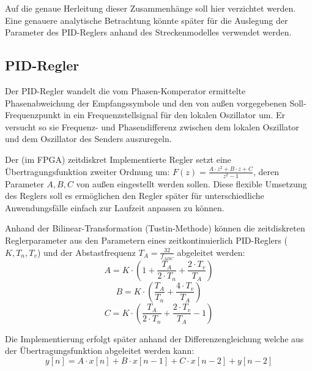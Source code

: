 Auf die genaue Herleitung dieser Zusammenhänge soll hier verzichtet werden. Eine genauere analytische Betrachtung \cite{IEEE_ART_COSTAS} könnte später für die Auslegung der Parameter
des \acs{PID}-Reglers anhand des Streckenmodelles verwendet werden.
		
\subsection{\acs{PID}-Regler}
	
Der \acs{PID}-Regler wandelt die vom Phasen-Komperator ermittelte Phasenabweichung der Empfangssymbole und den von außen vorgegebenen Soll-Frequenzpunkt 
in ein Frequenzstellsignal für den lokalen Oszillator um. Er versucht so sie Frequenz- und Phasendifferenz zwischen dem lokalen Oszillator und dem Oszillator des Senders
auszuregeln.
	
Der (im \acs{FPGA}) zeitdiskret Implementierte Regler setzt eine Übertragungsfunktion zweiter Ordnung um: $F(z)=\frac{A\cdot z^2 + B\cdot z + C}{z^2 - 1}$, deren Parameter $A,B,C$
von außen eingestellt werden sollen. Diese flexible Umsetzung des Reglers soll es ermöglichen den Regler später für unterschiedliche Anwendungsfälle einfach zur Laufzeit anpassen zu können.

Anhand der Bilinear-Transformation (Tustin-Methode) können die zeitdiskreten Reglerparameter aus den Parametern eines zeitkontinuierlich \acs{PID}-Reglers ($K,T_n,T_v$) und der Abstastfrequenz
$T_A = \frac{32}{f_{ADC}}$ abgeleitet werden:
\begin{equation}
	A = K\cdot (1 + \frac{T_A}{2\cdot T_n} + \frac{2\cdot T_v}{T_A})
\end{equation}
\begin{equation}
	B = K\cdot (\frac{T_A}{T_n} + \frac{4\cdot T_v}{T_A})
\end{equation}
\begin{equation}
	C = K\cdot (\frac{T_A}{2\cdot T_n} + \frac{2\cdot T_v}{T_A} - 1)
\end{equation}

Die Implementierung erfolgt später anhand der Differenzengleichung welche aus der Übertragungsfunktion abgeleitet werden kann: 
\begin{equation}
	y[n] = A\cdot x[n] + B\cdot x[n-1] + C\cdot x[n-2] + y[n-2]
\end{equation}